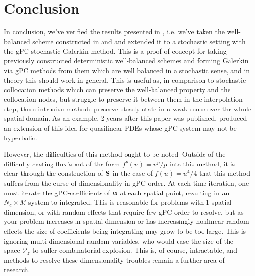 \documentclass[12pt]{article}
\begin{document}
\section{Conclusion}
In conclusion, we've verified the results presented in \cite{Jin2015}, i.e. we've taken the well-balanced scheme constructed in \cite{Jin2001} and and extended it to a stochastic setting with the gPC stochastic Galerkin method. 
This is a proof of concept for taking previously constructed deterministic well-balanced schemes and forming Galerkin via gPC methods from them which are well balanced in a stochastic sense, and in theory this should work in general.
This is useful as, in comparison to stochastic collocation methods which can preserve the well-balanced property and the collocation nodes, but struggle to preserve it between them in the interpolation step, these intrusive methods preserve steady state in a weak sense over the whole spatial domain.
As an example, 2 years after this paper was published, \cite{Wu2017} produced an extension of this idea for quasilinear PDEs whose gPC-system may not be hyperbolic.

However, the difficulties of this method ought to be noted.
Outside of the difficulty casting flux's not of the form $f^p(u) = u^p / p$ into this method, it is clear through the construction of $\mathbf{{S}}$ in the case of $f(u) = u^4 / 4$ that this method suffers from the curse of dimensionality in gPC-order.
At each time iteration, one must iterate the gPC-coefficients of $\vb{u}$ at each spatial point, resulting in an $N_c \times M$ system to integrated.
This is reasonable for problems with 1 spatial dimension, or with random effects that require few gPC-order to resolve, but as your problem increases in spatial dimension or has increasingly nonlinear random effects the size of coefficients being integrating may grow to be too large.
This is ignoring multi-dimensional random variables, who would case the size of the space $\mathcal{P}_z$ to suffer combinatorial explosion.
This is, of course, intractable, and methods to resolve these dimensionality troubles remain a further area of research.

\printbibliography
\end{document}

